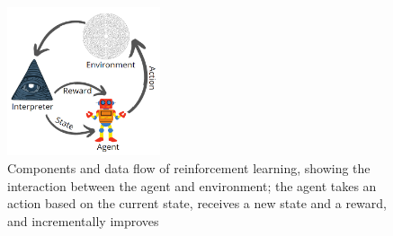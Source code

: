 \begin{figure}[H]
  \centering
  \includegraphics[width=0.4\textwidth]{figures/images/rl.png}
  \caption[Reinforcement learning flow]{Components and data flow of reinforcement learning, showing the interaction between the agent and environment; the agent takes an action based on the current state, receives a new state and a reward, and incrementally improves \cite{erainnovator2021reinforcement}}
  \label{fig:rl}
\end{figure}
